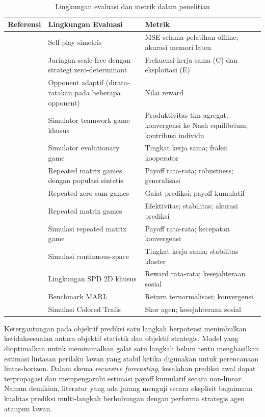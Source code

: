 \begin{table}[htbp]
\centering
\caption{Lingkungan evaluasi dan metrik dalam penelitian}\label{tab:evaluation_metrics}
\renewcommand{\arraystretch}{1.2}
\setlength{\tabcolsep}{4pt}
\begin{tabularx}{\columnwidth}{c >{\raggedright\arraybackslash}X >{\raggedright\arraybackslash}X}
\midrule
\textbf{Referensi} & \textbf{Lingkungan Evaluasi} & \textbf{Metrik} \\
\midrule
~\cite{qiao_o2m_2024} & Self-play simetris & MSE selama pelatihan offline; akurasi memori laten \\
~\cite{zhu_evolutionary_2025} & Jaringan scale-free dengan strategi zero-determinant & Frekuensi kerja sama (C) dan eksploitasi (E) \\
~\cite{lv_inducing_2023} & Opponent adaptif (dirata-ratakan pada beberapa opponent) & Nilai reward \\
~\cite{gomez_grounded_2025} & Simulator teamwork-game khusus & Produktivitas tim agregat; konvergensi ke Nash equilibrium; kontribusi individu \\
~\cite{di_coupling_2023} & Simulator evolutionary game & Tingkat kerja sama; fraksi kooperator \\
~\cite{perera_learning_2025} & Repeated matrix games dengan populasi sintetis & Payoff rata-rata; robustness; generalisasi \\
~\cite{li_exploiting_2025} & Repeated zero-sum games & Galat prediksi; payoff kumulatif \\
~\cite{freire_modeling_2023} & Repeated matrix games & Efektivitas; stabilitas; akurasi prediksi \\
~\cite{hu_modeling_2023} & Simulasi repeated matrix game & Payoff rata-rata; kecepatan konvergensi \\
~\cite{elhamer_effects_2020} & Simulasi continuous-space & Tingkat kerja sama; stabilitas klaster \\
~\cite{wang_achieving_2019} & Lingkungan SPD 2D khusus & Reward rata-rata; kesejahteraan sosial \\
~\cite{jin_achieving_2025} & Benchmark MARL & Return ternormalisasi; konvergensi \\
~\cite{de_weerd_higher-order_2022} & Simulasi Colored Trails & Skor agen; kesejahteraan sosial \\
\midrule
\end{tabularx}
\end{table}

Ketergantungan pada objektif prediksi satu langkah berpotensi menimbulkan ketidaksesuaian antara objektif statistik dan objektif strategis. Model yang dioptimalkan untuk meminimalkan galat satu langkah belum tentu menghasilkan estimasi lintasan perilaku lawan yang stabil ketika digunakan untuk perencanaan lintas-horizon. Dalam skema \textit{recursive forecasting}, kesalahan prediksi awal dapat terpropagasi dan mempengaruhi estimasi payoff kumulatif secara non-linear. Namun demikian, literatur yang ada jarang menguji secara eksplisit bagaimana kualitas prediksi multi-langkah berhubungan dengan performa strategis agen ataupun lawan.

